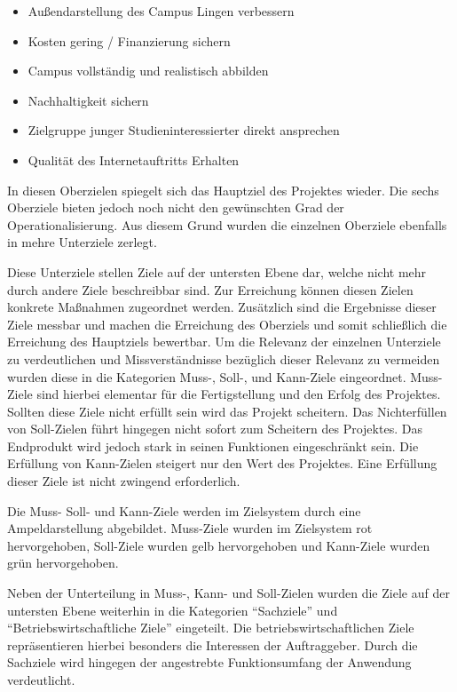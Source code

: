 \begin{itemize}
  \item Außendarstellung des Campus Lingen verbessern
  \item Kosten gering / Finanzierung sichern
  \item Campus vollständig und realistisch abbilden
  \item Nachhaltigkeit sichern
  \item Zielgruppe junger Studieninteressierter direkt ansprechen
  \item Qualität des Internetauftritts Erhalten
\end{itemize}

In diesen Oberzielen spiegelt sich das Hauptziel des Projektes wieder. Die
sechs Oberziele bieten jedoch noch nicht den gewünschten Grad der
Operationalisierung. Aus diesem Grund wurden die einzelnen Oberziele ebenfalls
in mehre Unterziele zerlegt.

Diese Unterziele stellen Ziele auf der untersten Ebene dar, welche nicht
mehr durch andere Ziele beschreibbar sind. Zur Erreichung können diesen Zielen
konkrete Maßnahmen zugeordnet werden. Zusätzlich sind die Ergebnisse dieser
Ziele messbar und machen die Erreichung des Oberziels und somit schließlich
die Erreichung des Hauptziels bewertbar. Um die Relevanz der einzelnen
Unterziele zu verdeutlichen und Missverständnisse bezüglich dieser Relevanz zu
vermeiden wurden diese in die Kategorien Muss-, Soll-, und Kann-Ziele
eingeordnet. Muss-Ziele sind hierbei elementar für die Fertigstellung und den
Erfolg des Projektes. Sollten diese Ziele nicht erfüllt sein wird das Projekt
scheitern. Das Nichterfüllen von Soll-Zielen führt hingegen nicht sofort zum
Scheitern des Projektes. Das Endprodukt wird jedoch stark in seinen Funktionen
eingeschränkt sein. Die Erfüllung von Kann-Zielen steigert nur den Wert des
Projektes. Eine Erfüllung dieser Ziele ist nicht zwingend erforderlich.

Die Muss- Soll- und Kann-Ziele werden im Zielsystem durch eine Ampeldarstellung
abgebildet.  Muss-Ziele wurden im Zielsystem rot hervorgehoben, Soll-Ziele
wurden gelb hervorgehoben und Kann-Ziele wurden grün hervorgehoben.

Neben der Unterteilung in Muss-, Kann- und Soll-Zielen wurden die Ziele auf der
untersten Ebene weiterhin in die Kategorien "`Sachziele"' und
"`Betriebswirtschaftliche Ziele"' eingeteilt. Die betriebswirtschaftlichen
Ziele repräsentieren hierbei besonders die Interessen der Auftraggeber. Durch
die Sachziele wird hingegen der angestrebte Funktionsumfang der Anwendung
verdeutlicht.

